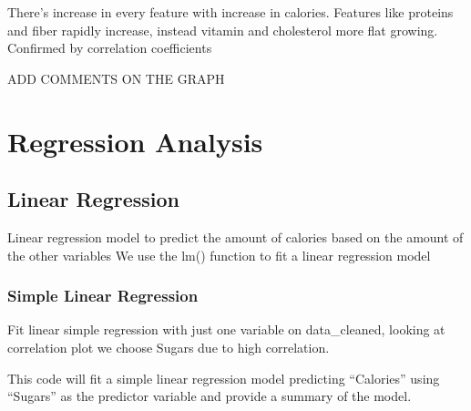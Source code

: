 \documentclass[
]{article}
\newenvironment{Shaded}{\begin{snugshade}}{\end{snugshade}}
\newcommand{\AttributeTok}[1]{\textcolor[rgb]{0.13,0.29,0.53}{#1}}
\newcommand{\FunctionTok}[1]{\textcolor[rgb]{0.13,0.29,0.53}{\textbf{#1}}}
\newcommand{\NormalTok}[1]{#1}
\newcommand{\OtherTok}[1]{\textcolor[rgb]{0.56,0.35,0.01}{#1}}
\newcommand{\SpecialCharTok}[1]{\textcolor[rgb]{0.81,0.36,0.00}{\textbf{#1}}}
\newcommand{\StringTok}[1]{\textcolor[rgb]{0.31,0.60,0.02}{#1}}
\begin{document}
There's increase in every feature with increase in calories. Features
like proteins and fiber rapidly increase, instead vitamin and
cholesterol more flat growing. Confirmed by correlation coefficients

ADD COMMENTS ON THE GRAPH

\section{Regression Analysis}\label{regression-analysis}

\subsection{Linear Regression}\label{linear-regression}

Linear regression model to predict the amount of calories based on the
amount of the other variables We use the lm() function to fit a linear
regression model

\subsubsection{Simple Linear Regression}\label{simple-linear-regression}

Fit linear simple regression with just one variable on data\_cleaned,
looking at correlation plot we choose Sugars due to high correlation.

This code will fit a simple linear regression model predicting
``Calories'' using ``Sugars'' as the predictor variable and provide a
summary of the model.

\begin{Shaded}
\end{Shaded}
\end{document}

